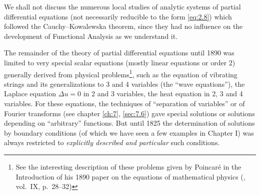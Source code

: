 \documentclass[12pt,a4paper,leqno,twoside]{extbook}
\begin{document}
We shall not discuss the numerous local studies of analytic systems of partial differential equations (not necessarily reducible to the form \eqref{eq:2.8}) which followed the Cauchy--Kowalewska theorem, since they had no influence on the development of Functional Analysis as we understand it.

The remainder of the theory of partial differential equations until 1890 was limited to very special scalar equations (mostly linear equations or order 2) generally derived from physical problems\footnote{See the interesting description of these problems given by Poincaré in the Introduction of his 1890 paper on the equations of mathematical physics (\cite{177}, vol.~IX, p.~28--32)}, such as the equation of vibrating strings and its generalizations to 3 and 4 variables (the ``wave equations''), the Laplace equation \(\Delta u = 0\) in 2 and 3 variables, the heat equation in 2, 3 and 4 variables. For these equations, the techniques of ``separation of variables'' or of Fourier transforms (see chapter \ref{ch:7}, \ref{sec:7.6}) gave special solutions or solutions depending on ``arbitrary'' functions. But until 1825 the determination of solutions by boundary conditions (of which we have seen a few examples in Chapter I) was always restricted to \emph{explicitly described and particular} such conditions.
\end{document}
